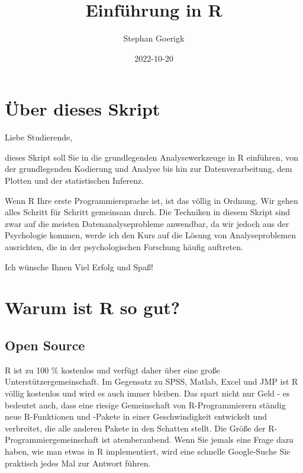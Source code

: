 \documentclass[
]{book}
\title{Einführung in R}
\author{Stephan Goerigk}
\date{2022-10-20}
\begin{document}
\maketitle

{
\setcounter{tocdepth}{1}
\tableofcontents
}
\hypertarget{uxfcber-dieses-skript}{%
\chapter*{Über dieses Skript}\label{uxfcber-dieses-skript}}

Liebe Studierende,

dieses Skript soll Sie in die grundlegenden Analysewerkzeuge in R einführen, von der grundlegenden Kodierung und Analyse bis hin zur Datenverarbeitung, dem Plotten und der statistischen Inferenz.

Wenn R Ihre erste Programmiersprache ist, ist das völlig in Ordnung. Wir gehen alles Schritt für Schritt gemeinsam durch. Die Techniken in diesem Skript sind zwar auf die meisten Datenanalyseprobleme anwendbar, da wir jedoch aus der Psychologie kommen, werde ich den Kurs auf die Lösung von Analyseproblemen ausrichten, die in der psychologischen Forschung häufig auftreten.

Ich wünsche Ihnen Viel Erfolg und Spaß!

\hypertarget{warum-ist-r-so-gut}{%
\chapter{Warum ist R so gut?}\label{warum-ist-r-so-gut}}

\hypertarget{open-source}{%
\section{Open Source}\label{open-source}}

R ist zu 100 \% kostenlos und verfügt daher über eine große Unterstützergemeinschaft. Im Gegensatz zu SPSS, Matlab, Excel und JMP ist R völlig kostenlos und wird es auch immer bleiben. Das spart nicht nur Geld - es bedeutet auch, dass eine riesige Gemeinschaft von R-Programmierern ständig neue R-Funktionen und -Pakete in einer Geschwindigkeit entwickelt und verbreitet, die alle anderen Pakete in den Schatten stellt. Die Größe der R-Programmiergemeinschaft ist atemberaubend. Wenn Sie jemals eine Frage dazu haben, wie man etwas in R implementiert, wird eine schnelle Google-Suche Sie praktisch jedes Mal zur Antwort führen.
\end{document}
